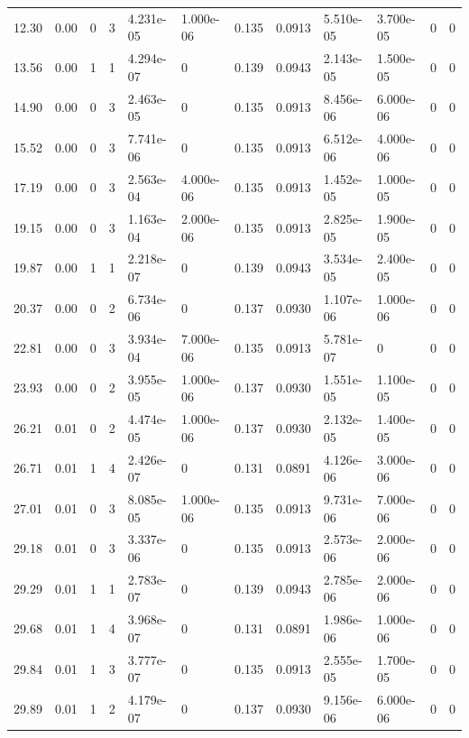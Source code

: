 \documentclass[preview]{standalone}
\begin{document}
{{\begin{tabular}{L{1.2cm}C{1.2cm} C{0.3cm}C{0.5cm} C{1.4cm}C{1.4cm} C{1.4cm}C{1.4cm} C{1.6cm}C{1.6cm} C{1.6cm}C{1.6cm}}
  12.30  &  0.00  & 0     &  3 &  4.231e-05  & 1.000e-06  &  0.135&   0.0913& 5.510e-05 & 3.700e-05   &  0 & 0  \\ 
  13.56  &  0.00  & 1     &  1 &  4.294e-07  & 0  &  0.139&   0.0943& 2.143e-05 & 1.500e-05   &  0 & 0  \\ 
  14.90  &  0.00  & 0     &  3 &  2.463e-05  & 0  &  0.135&   0.0913& 8.456e-06 & 6.000e-06   &  0 & 0  \\ 
  15.52  &  0.00  & 0     &  3 &  7.741e-06  & 0  &  0.135&   0.0913& 6.512e-06 & 4.000e-06   &  0 & 0  \\ 
  17.19  &  0.00  & 0     &  3 &  2.563e-04  & 4.000e-06  &  0.135&   0.0913& 1.452e-05 & 1.000e-05   &  0 & 0  \\ 
  19.15  &  0.00  & 0     &  3 &  1.163e-04  & 2.000e-06  &  0.135&   0.0913& 2.825e-05 & 1.900e-05   &  0 & 0  \\ 
  19.87  &  0.00  & 1     &  1 &  2.218e-07  & 0  &  0.139&   0.0943& 3.534e-05 & 2.400e-05   &  0 & 0  \\ 
  20.37  &  0.00  & 0     &  2 &  6.734e-06  & 0  &  0.137&   0.0930& 1.107e-06 & 1.000e-06   &  0 & 0  \\ 
  22.81  &  0.00  & 0     &  3 &  3.934e-04  & 7.000e-06  &  0.135&   0.0913& 5.781e-07 & 0   &  0 & 0  \\ 
  23.93  &  0.00  & 0     &  2 &  3.955e-05  & 1.000e-06  &  0.137&   0.0930& 1.551e-05 & 1.100e-05   &  0 & 0  \\ 
  26.21  &  0.01  & 0     &  2 &  4.474e-05  & 1.000e-06  &  0.137&   0.0930& 2.132e-05 & 1.400e-05   &  0 & 0  \\ 
  26.71  &  0.01  & 1     &  4 &  2.426e-07  & 0  &  0.131&   0.0891& 4.126e-06 & 3.000e-06   &  0 & 0  \\ 
  27.01  &  0.01  & 0     &  3 &  8.085e-05  & 1.000e-06  &  0.135&   0.0913& 9.731e-06 & 7.000e-06   &  0 & 0  \\ 
  29.18  &  0.01  & 0     &  3 &  3.337e-06  & 0  &  0.135&   0.0913& 2.573e-06 & 2.000e-06   &  0 & 0  \\ 
  29.29  &  0.01  & 1     &  1 &  2.783e-07  & 0  &  0.139&   0.0943& 2.785e-06 & 2.000e-06   &  0 & 0  \\ 
  29.68  &  0.01  & 1     &  4 &  3.968e-07  & 0  &  0.131&   0.0891& 1.986e-06 & 1.000e-06   &  0 & 0  \\ 
  29.84  &  0.01  & 1     &  3 &  3.777e-07  & 0  &  0.135&   0.0913& 2.555e-05 & 1.700e-05   &  0 & 0  \\ 
  29.89  &  0.01  & 1     &  2 &  4.179e-07  & 0  &  0.137&   0.0930& 9.156e-06 & 6.000e-06   &  0 & 0  \\ 

\end{tabular}}}
\end{document}
